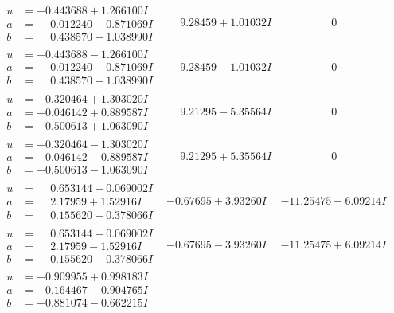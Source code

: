 \documentclass[1p]{elsarticle_modified}
\theoremstyle{definition}
\begin{document}
$$\begin{array}{c|c|c}
\begin{aligned}
u &= -0.443688 + 1.266100 I \\
a &= \phantom{-}0.012240 - 0.871069 I \\
b &= \phantom{-}0.438570 - 1.038990 I\end{aligned}
 & \phantom{-}9.28459 + 1.01032 I & \phantom{-0.000000 } 0 \\ \hline\begin{aligned}
u &= -0.443688 - 1.266100 I \\
a &= \phantom{-}0.012240 + 0.871069 I \\
b &= \phantom{-}0.438570 + 1.038990 I\end{aligned}
 & \phantom{-}9.28459 - 1.01032 I & \phantom{-0.000000 } 0 \\ \hline\begin{aligned}
u &= -0.320464 + 1.303020 I \\
a &= -0.046142 + 0.889587 I \\
b &= -0.500613 + 1.063090 I\end{aligned}
 & \phantom{-}9.21295 - 5.35564 I & \phantom{-0.000000 } 0 \\ \hline\begin{aligned}
u &= -0.320464 - 1.303020 I \\
a &= -0.046142 - 0.889587 I \\
b &= -0.500613 - 1.063090 I\end{aligned}
 & \phantom{-}9.21295 + 5.35564 I & \phantom{-0.000000 } 0 \\ \hline\begin{aligned}
u &= \phantom{-}0.653144 + 0.069002 I \\
a &= \phantom{-}2.17959 + 1.52916 I \\
b &= \phantom{-}0.155620 + 0.378066 I\end{aligned}
 & -0.67695 + 3.93260 I & -11.25475 - 6.09214 I \\ \hline\begin{aligned}
u &= \phantom{-}0.653144 - 0.069002 I \\
a &= \phantom{-}2.17959 - 1.52916 I \\
b &= \phantom{-}0.155620 - 0.378066 I\end{aligned}
 & -0.67695 - 3.93260 I & -11.25475 + 6.09214 I \\ \hline\begin{aligned}
u &= -0.909955 + 0.998183 I \\
a &= -0.164467 - 0.904765 I \\
b &= -0.881074 - 0.662215 I\end{aligned}

\end{array}$$
\end{document}
